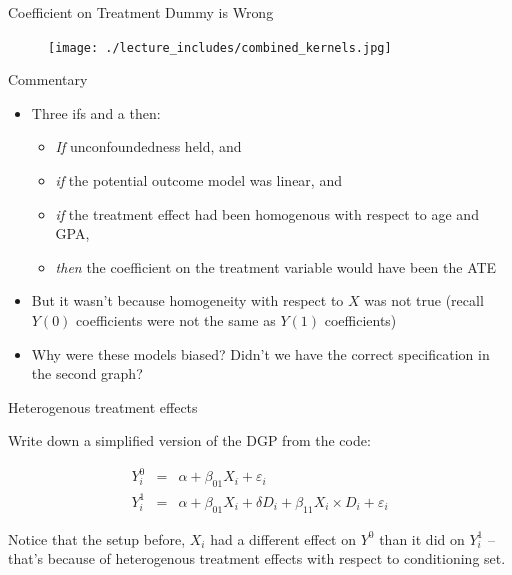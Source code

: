 \documentclass{beamer}
\begin{document}
\begin{frame}{Coefficient on Treatment Dummy is Wrong}

\begin{figure}[!t]\centering
\texttt{[image: ./lecture\_includes/combined\_kernels.jpg]}
\end{figure}

\end{frame}

\begin{frame}{Commentary}

\begin{itemize}

\item Three ifs and a then:

	\begin{itemize}
	\item \emph{If} unconfoundedness held, and 
	\item \emph{if} the potential outcome model was linear, and
	\item  \emph{if} the treatment effect had been homogenous with respect to age and GPA, 
	\item \emph{then} the coefficient on the treatment variable would have been the ATE 
	\end{itemize}
	
\item But it wasn't because homogeneity with respect to $X$ was not true (recall $Y(0)$ coefficients were not the same as $Y(1)$ coefficients)
\item Why were these models biased?  Didn't we have the correct specification in the second graph? 
\end{itemize}

\end{frame}

\begin{frame}{Heterogenous treatment effects}

Write down a simplified version of the DGP from the code:

\begin{eqnarray*}
Y^0_i &=& \alpha + \beta_{01} X_i + \varepsilon_i \\
Y^1_i &=& \alpha + \beta_{01} X_i + \delta D_i + \beta_{11} X_i \times D_i + \varepsilon_i
\end{eqnarray*}

\bigskip

Notice that the setup before, $X_i$ had a different effect on $Y^0$ than it did on $Y_i^1$ -- that's because of heterogenous treatment effects with respect to conditioning set. 

\end{frame}
\end{document}
